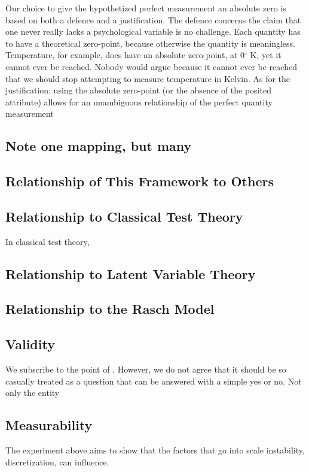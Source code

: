 \documentclass[utf8]{FrontiersinVancouver}
\begin{document}
Our choice to give the hypothetized perfect measurement an absolute zero is based on both a defence and a justification. The defence concerns the claim that one never really lacks a psychological variable is no challenge. Each quantity has to have a theoretical zero-point, because otherwise the quantity is meaningless. Temperature, for example, does have an absolute zero-point, at 0$^\circ$ K, yet it cannot ever be reached. Nobody would argue because it cannot ever be reached that we should stop attempting to measure temperature in Kelvin. As for the justification: using the absolute zero-point (or the absence of the posited attribute) allows for an unambiguous relationship of the perfect quantity measurement 



\subsection{Note one mapping, but many}

\subsection{Relationship of This Framework to Others}
\subsection{Relationship to Classical Test Theory}
In classical test theory, 

\subsection{Relationship to Latent Variable Theory}

\subsection{Relationship to the Rasch Model}

\subsection{Validity}
We subscribe to the point of . However, we do not agree that it should be so casually treated as a question that can be answered with a simple yes or no. Not only the entity 

\subsection{Measurability}
The experiment above aims to show that the factors that go into scale instability, discretization, can influence. 
\end{document}

